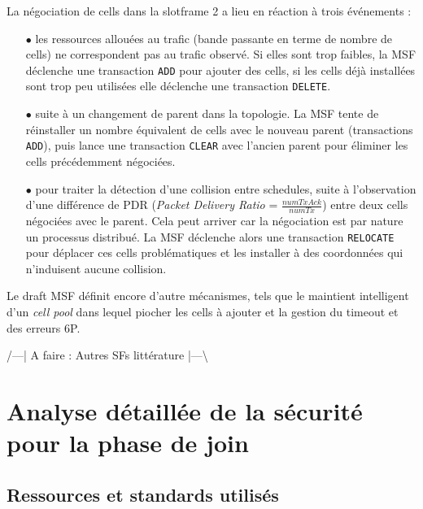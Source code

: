 \documentclass[]{report}
\newcommand{\todo}[1]{\par{\color{red} /---| A faire : #1 |---\textbackslash\\}}
\begin{document}
\par La négociation de cells dans la slotframe 2 a lieu en réaction à trois événements :
\begin{itemize}
\item[$\bullet$] les ressources allouées au trafic (bande passante en terme de nombre de cells) ne correspondent pas au trafic observé. Si elles sont trop faibles, la MSF déclenche une transaction \texttt{ADD} pour ajouter des cells, si les cells déjà installées sont trop peu utilisées elle déclenche une transaction \texttt{DELETE}. 
\vspace{0.1cm}
\item[$\bullet$] suite à un changement de parent dans la topologie. La MSF tente de réinstaller un nombre équivalent de cells avec le nouveau parent (transactions \texttt{ADD}), puis lance une transaction \texttt{CLEAR} avec l'ancien parent pour éliminer les cells précédemment négociées.
\vspace{0.1cm}
\item[$\bullet$] pour traiter la détection d'une collision entre schedules, suite à l'observation d'une différence de PDR (\textit{Packet Delivery Ratio} = $\frac{numTxAck}{numTx}$) entre deux cells négociées avec le parent. Cela peut arriver car la négociation est par nature un processus distribué. La MSF déclenche alors une transaction \texttt{RELOCATE} pour déplacer ces cells problématiques et les installer à des coordonnées qui n'induisent aucune collision.
\end{itemize}

\vspace{0.4cm}

\par Le draft MSF \cite{ietf-6tisch-msf-10} définit encore d'autre mécanismes, tels que le maintient intelligent d'un \textit{cell pool} dans lequel piocher les cells à ajouter et la gestion du timeout et des erreurs 6P. 

\todo{Autres SFs littérature}

	
\chapter{Analyse détaillée de la sécurité pour la phase de join}
\label{joining_analysis}
\newpage

\section{Ressources et standards utilisés}
\end{document}
